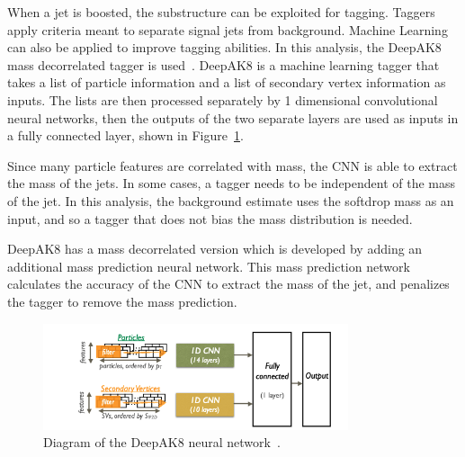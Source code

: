 When a jet is boosted, the substructure can be exploited for tagging. Taggers apply criteria meant to separate signal jets from background. Machine Learning can also be applied to improve tagging abilities. In this analysis, the DeepAK8 mass decorrelated tagger is used~\cite{CMS:2020poo}. DeepAK8 is a machine learning tagger that takes a list of particle information and a list of secondary vertex information as inputs. The lists are then processed separately by 1 dimensional convolutional neural networks, then the outputs of the two separate layers are used as inputs in a fully connected layer, shown in Figure~\ref{fig:deepak8}.

Since many particle features are correlated with mass, the CNN is able to extract the mass of the jets. In some cases, a tagger needs to be independent of the mass of the jet. In this analysis, the background estimate uses the softdrop mass as an input, and so a tagger that does not bias the mass distribution is needed.

DeepAK8 has a mass decorrelated version which is developed by adding an additional mass prediction neural network. This mass prediction network calculates the accuracy of the CNN to extract the mass of the jet, and penalizes the tagger to remove the mass prediction.


\begin{figure}[h]
\centering
	\includegraphics[width=0.8\textwidth]{figures/deepak8.png}
	\caption{Diagram of the DeepAK8 neural network~\cite{CMS:2020poo}.}
	\label{fig:deepak8}
\end{figure}



